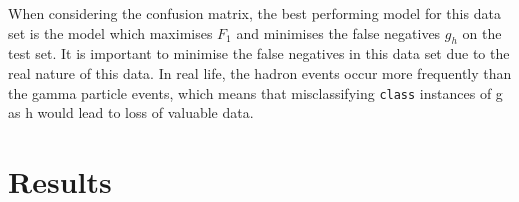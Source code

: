 \documentclass[a4paper, 11pt, twocolumn]{article}
\begin{document}
When considering the confusion matrix, the best performing model for this data 
set is the model which maximises $F_1$ and minimises the false negatives $g_h$ 
on the test set. It is important to minimise the false negatives in this data set 
due to the real nature of this data. In real life, the hadron events occur more 
frequently than the gamma particle events, which means that misclassifying 
\texttt{class} instances of g as h would lead to loss of valuable data. 


\section{Results}


\begin{table}[h]
\caption{Estimated optimal hyperparameters found using randomised search for the 
Multilayer Perceptron model.}
\label{tab:Tune_NN}
\end{table}


\begin{table}[h]
\caption{Estimated optimal hyperparameters found using randomised search for the 
Extreme Gradient Boosting model.}
\label{tab:Tune_XGB}
\end{table}
      
\end{document}
